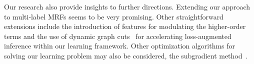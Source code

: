Our research also provide insights to further directions.
Extending our approach to multi-label MRFs seems to be very
promising. Other straightforward extensions include the
introduction of features for modulating the higher-order terms
and the use of dynamic graph cuts~\cite{Kohli:PAMI07} for
accelerating loss-augmented inference within our learning
framework. Other optimization algorithms for solving our learning
problem may also be considered, \eg the subgradient
method~\cite{Nowozin:2011, Bertsekas:2004}.






